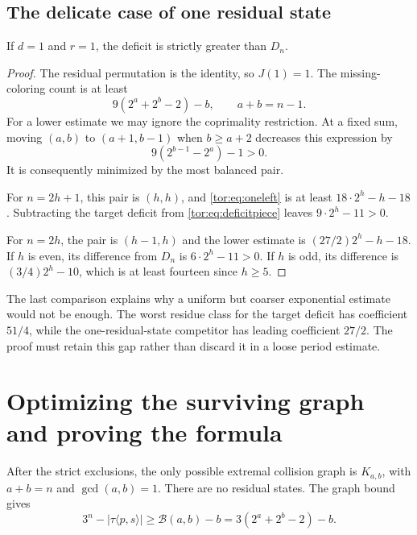 \documentclass[11pt,a4paper]{article}
\numberwithin{equation}{section}
\theoremstyle{definition}
\theoremstyle{remark}
\newcommand{\Bip}{\mathcal B}
\begin{document}
\subsection{The delicate case of one residual state}

\begin{lemma}\label{tor:lem:residualone}
If $d=1$ and $r=1$, the deficit is strictly greater than $D_n$.
\end{lemma}
\begin{proof}
The residual permutation is the identity, so $J(1)=1$. The missing-coloring
count is at least
\begin{equation}\label{tor:eq:oneleft}
 9(2^a+2^b-2)-b,\qquad a+b=n-1.
\end{equation}
For a lower estimate we may ignore the coprimality restriction. At a fixed
sum, moving $(a,b)$ to $(a+1,b-1)$ when $b\ge a+2$ decreases this expression
by
\[
 9(2^{b-1}-2^a)-1>0.
\]
It is consequently minimized by the most balanced pair.

For $n=2h+1$, this pair is $(h,h)$, and \eqref{tor:eq:oneleft} is at least
$18\cdot2^h-h-18$. Subtracting the target deficit from
\eqref{tor:eq:deficitpiece} leaves $9\cdot2^h-11>0$.

For $n=2h$, the pair is $(h-1,h)$ and the lower estimate is
$(27/2)2^h-h-18$. If $h$ is even, its difference from $D_n$ is
$6\cdot2^h-11>0$. If $h$ is odd, its difference is $(3/4)2^h-10$, which is at
least fourteen since $h\ge5$.
\end{proof}

The last comparison explains why a uniform but coarser exponential estimate
would not be enough. The worst residue class for the target deficit has
coefficient $51/4$, while the one-residual-state competitor has leading
coefficient $27/2$. The proof must retain this gap rather than discard it in
a loose period estimate.

\section{Optimizing the surviving graph and proving the formula}\label{tor:sec:mainproof}

After the strict exclusions, the only possible extremal collision graph is
$K_{a,b}$, with $a+b=n$ and $\gcd(a,b)=1$. There are no residual states. The
graph bound gives
\begin{equation}\label{tor:eq:surviving}
 3^n-|\tau\langle p,s\rangle|
 \ge\Bip(a,b)-b=3(2^a+2^b-2)-b.
\end{equation}
\end{document}
